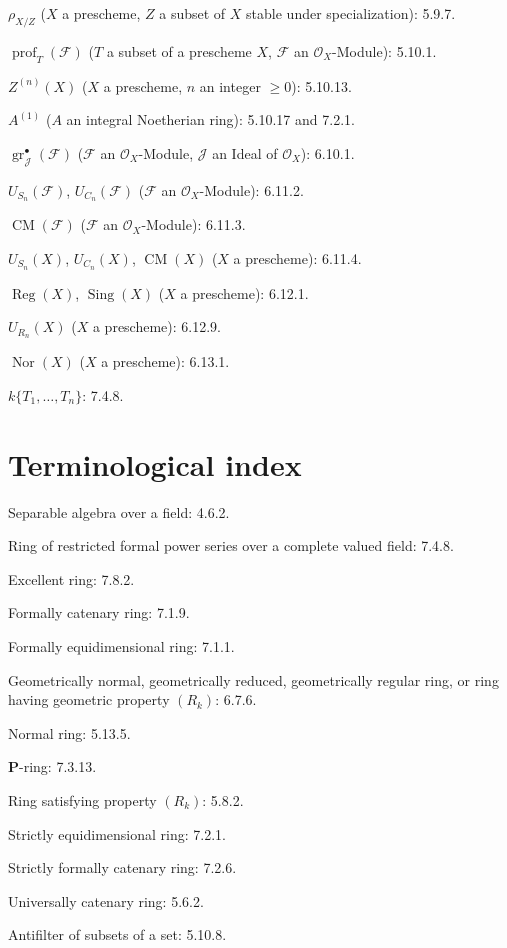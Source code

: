 $\rho_{X/Z}$ ($X$ a prescheme, $Z$ a subset of $X$ stable under
specialization): 5.9.7.

$\operatorname{prof}_T(\mathscr F)$ ($T$ a subset of a prescheme $X$,
$\mathscr F$ an $\mathcal O_X$-Module): 5.10.1.

$Z^{(n)}(X)$ ($X$ a prescheme, $n$ an integer $\geq0$): 5.10.13.

$A^{(1)}$ ($A$ an integral Noetherian ring): 5.10.17 and 7.2.1.

$\operatorname{gr}_{\mathscr J}^{\bullet}(\mathscr F)$ ($\mathscr F$ an
$\mathcal O_X$-Module, $\mathscr J$ an Ideal of $\mathcal O_X$): 6.10.1.

$U_{S_n}(\mathscr F)$, $U_{C_n}(\mathscr F)$ ($\mathscr F$ an
$\mathcal O_X$-Module): 6.11.2.

$\operatorname{CM}(\mathscr F)$ ($\mathscr F$ an $\mathcal O_X$-Module): 6.11.3.

$U_{S_n}(X)$, $U_{C_n}(X)$, $\operatorname{CM}(X)$ ($X$ a prescheme): 6.11.4.

$\operatorname{Reg}(X)$, $\operatorname{Sing}(X)$ ($X$ a prescheme): 6.12.1.

$U_{R_n}(X)$ ($X$ a prescheme): 6.12.9.

$\operatorname{Nor}(X)$ ($X$ a prescheme): 6.13.1.

$k\{T_1,\ldots,T_n\}$: 7.4.8.

\endgroup

\clearpage
{}
{}
\section*{Terminological index}

\begingroup
\footnotesize
\setlength{\parindent}{0pt}
\setlength{\parskip}{1.1pt}
\newcommand{\EGAIVtwoTermEN}[2]{#1: #2.\par}

\EGAIVtwoTermEN{Separable algebra over a field}{4.6.2}
\EGAIVtwoTermEN{Ring of restricted formal power series over a complete valued field}{7.4.8}
\EGAIVtwoTermEN{Excellent ring}{7.8.2}
\EGAIVtwoTermEN{Formally catenary ring}{7.1.9}
\EGAIVtwoTermEN{Formally equidimensional ring}{7.1.1}
\EGAIVtwoTermEN{Geometrically normal, geometrically reduced, geometrically
regular ring, or ring having geometric property $(R_k)$}{6.7.6}
\EGAIVtwoTermEN{Normal ring}{5.13.5}
\EGAIVtwoTermEN{$\boldsymbol{P}$-ring}{7.3.13}
\EGAIVtwoTermEN{Ring satisfying property $(R_k)$}{5.8.2}
\EGAIVtwoTermEN{Strictly equidimensional ring}{7.2.1}
\EGAIVtwoTermEN{Strictly formally catenary ring}{7.2.6}
\EGAIVtwoTermEN{Universally catenary ring}{5.6.2}
\EGAIVtwoTermEN{Antifilter of subsets of a set}{5.10.8}

